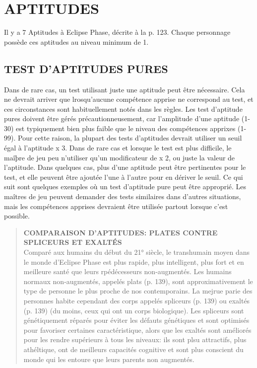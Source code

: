 \section{APTITUDES} Il y a 7 Aptitudes à Eclipse Phase, décrite à la p. 123. Chaque personnage possède ces aptitudes au niveau minimum de 1. 

\subsection{TEST D'APTITUDES PURES} Dans de rare cas, un test utilisant juste une aptitude peut être nécessaire. Cela ne devrait arriver que lrosqu'aucune compétence apprise ne correspond au test, et ces circonstances sont habituellement notés dans les règles. Les test d'aptitude pures doivent être gérés précautionneusement, car l'amplitude d'une aptitude (1-30) est typiquement bien plus faible que le niveau des compétences apprixes (1-99). Pour cette raison, la plupart des tests d'aptitudes devrait utiliser un seuil égal à l'aptitude x 3. Dans de rare cas et lorsque le test est plus difficile, le maîþre de jeu peu n'utiliser qu'un modificateur de x 2, ou juste la valeur de l'aptitude. Dans quelques cas, plus d'une aptitude peut être pertinentes pour le test, et elle peuvent être ajoutée l'une à l'autre pour en dériver le seuil. Ce qui suit sont quelques exemples où un test d'aptitude pure peut être approprié. Les maîtres de jeu peuvent demander des tests similaires dans d'autres situations, mais les compétences apprises devraient être utilisée partout lorsque c'est possible. 





\begin{quotation} \textbf{COMPARAISON D'APTITUDES: PLATES CONTRE SPLICEURS ET EXALTÉS} \\ Comparé aux humains du début du 21° siècle, le transhumain moyen dans le monde d'Eclipse Phase est plus rapide, plus intelligent, plus fort et en meilleure santé que leurs rpédécesseurs non-augmentés. Les humains normaux non-augmentés, appelés plats (p. 139), sont approximativement  le type de personne le plus proche de nos contemporains. La mejrue parie des personnes habite cependant des corps appelés spliceurs (p. 139) ou exaltés (p. 139) (du moins, ceux qui ont un corps biologique). Les spliceurs sont génétiquement réparés pour éviter les défauts génétiques et sont optimisés pour favoriser certaines caractéristique, alors que les exaltés sont améliorés pour les rendre supérieurs à tous les niveaux: ils sont plsu attractifs, plus athéltique, ont de meilleurs capacités cognitive et sont plus conscient du monde qui les entoure que leurs parents non augmentés. \end{quotation} 



